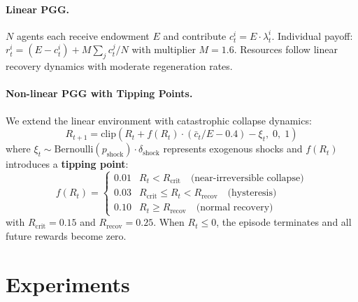 \documentclass{article}
\begin{document}
\paragraph{Linear PGG.}
$N$ agents each receive endowment $E$ and contribute $c_t^i = E \cdot \lambda_t^i$.
Individual payoff: $r_t^i = (E - c_t^i) + M \sum_j c_t^j / N$ with multiplier $M = 1.6$.
Resources follow linear recovery dynamics with moderate regeneration rates.

\paragraph{Non-linear PGG with Tipping Points.}
We extend the linear environment with catastrophic collapse dynamics:
\begin{equation}
R_{t+1} = \text{clip}\!\left(R_t + f(R_t) \cdot \left(\bar{c}_t / E - 0.4\right) - \xi_t,\; 0,\; 1\right)
\label{eq:resource}
\end{equation}
where $\xi_t \sim \text{Bernoulli}(p_{\text{shock}}) \cdot \delta_{\text{shock}}$ represents exogenous shocks and $f(R_t)$ introduces a \textbf{tipping point}:
\begin{equation}
f(R_t) = \begin{cases}
0.01 & R_t < R_{\text{crit}} \quad \text{(near-irreversible collapse)} \\
0.03 & R_{\text{crit}} \leq R_t < R_{\text{recov}} \quad \text{(hysteresis)} \\
0.10 & R_t \geq R_{\text{recov}} \quad \text{(normal recovery)}
\end{cases}
\label{eq:tipping}
\end{equation}
with $R_{\text{crit}} = 0.15$ and $R_{\text{recov}} = 0.25$.
When $R_t \leq 0$, the episode terminates and all future rewards become zero.

\section{Experiments}
\end{document}
